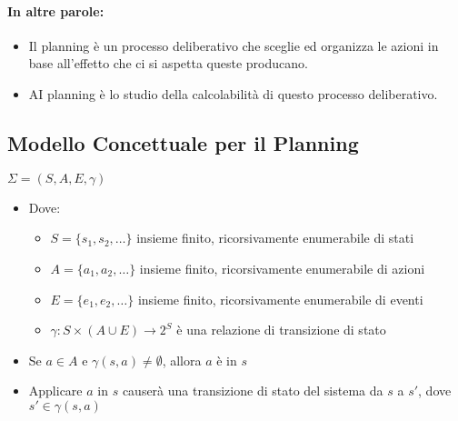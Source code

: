 

\paragraph{In altre parole:}

\begin{itemize}
  \item Il planning è un processo deliberativo che sceglie ed organizza le azioni in base
all’effetto che ci si aspetta queste producano. 
\item AI planning è lo studio della calcolabilità di questo processo deliberativo.
\end{itemize}

\subsection{Modello Concettuale per il Planning}

 $\Sigma = (S, A, E, \gamma)$
\begin{itemize}
    \item Dove:
    \begin{itemize}
        \item $S = \{s_1, s_2, \ldots\}$ insieme finito, ricorsivamente enumerabile di stati
        \item $A = \{a_1, a_2, \ldots\}$ insieme finito, ricorsivamente enumerabile di azioni
        \item $E = \{e_1, e_2, \ldots\}$ insieme finito, ricorsivamente enumerabile di eventi
        \item $\gamma : S \times (A \cup E) \rightarrow 2^S$ è una relazione di transizione di stato
    \end{itemize}
    
    \item Se $a \in A$ e $\gamma(s, a) \neq \emptyset$, allora $a$ è  in $s$
    
    \item Applicare $a$ in $s$ causerà una transizione di stato del sistema da $s$ a $s'$, dove $s' \in \gamma(s, a)$
\end{itemize}

